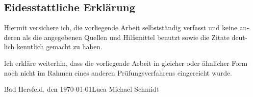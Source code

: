 
\clearpage
\begin{otherlanguage}{ngerman}
    \thispagestyle{empty}
    \section*{Eidesstattliche Erklärung}

    Hiermit versichere ich, die vorliegende Arbeit selbstständig verfasst und
    keine anderen als die angegebenen Quellen und Hilfsmittel benutzt sowie
    die Zitate deutlich kenntlich gemacht zu haben.

    Ich erkläre weiterhin, dass die vorliegende Arbeit in gleicher oder ähnlicher
    Form noch nicht im Rahmen eines anderen Prüfungsverfahrens eingereicht wurde.

    \vspace{4\baselineskip}

    {\small Bad Hersfeld, den \today \hfill Luca Michael Schmidt}

    \vspace{4\baselineskip}
\end{otherlanguage}
